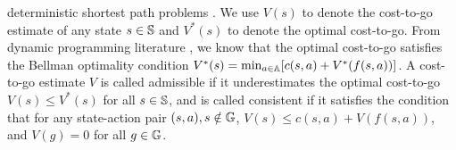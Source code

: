 deterministic shortest path problems
\cite{DBLP:books/lib/Bertsekas05}. 
We use $V(s)$ to denote the cost-to-go estimate of any state $s \in
\mathbb{S}$ and $V^*(s)$ to denote the optimal cost-to-go. From
dynamic programming literature \cite{DBLP:books/lib/Bertsekas05}, we know
that the optimal cost-to-go satisfies the Bellman optimality condition
$V^*(s) = \min_{a \in \mathbb{A}} [c(s, a) + V^*(f(s, a))]$.
A cost-to-go estimate $V$ is
called admissible if it underestimates the optimal cost-to-go
$V(s) \leq V^*(s)$ for all $s \in \mathbb{S}$, and
is called consistent if it satisfies the condition that for any
state-action pair $(s, a), s\notin\mathbb{G}$, $V(s) \leq c(s, a) + V(f(s, a))$, and $V(g) = 0$ for
all $g \in \mathbb{G}$.

